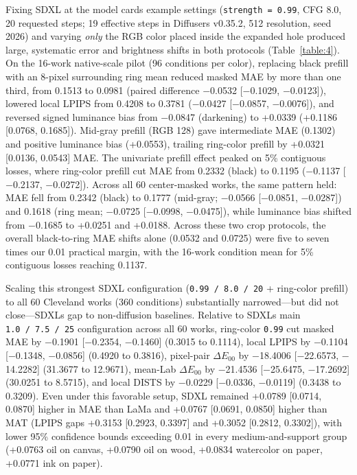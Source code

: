 \documentclass[fleqn,12pt,lineno]{wlpeerj}
\begin{document}
Fixing SDXL at the model card\textquotesingle s example settings (\texttt{strength\ =\ 0.99}, CFG 8.0, 20 requested steps; 19 effective steps in Diffusers v0.35.2, 512 resolution, seed 2026) and varying \emph{only} the RGB color placed inside the expanded hole produced large, systematic error and brightness shifts in both protocols (Table~\ref{table:4}). On the 16-work native-scale pilot (96 conditions per color), replacing black prefill with an 8-pixel surrounding ring mean reduced masked MAE by more than one third, from 0.1513 to 0.0981 (paired difference \ensuremath{-}0.0532 {[}\ensuremath{-}0.1029, \ensuremath{-}0.0123{]}), lowered local LPIPS from 0.4208 to 0.3781 (\ensuremath{-}0.0427 {[}\ensuremath{-}0.0857, \ensuremath{-}0.0076{]}), and reversed signed luminance bias from \ensuremath{-}0.0847 (darkening) to +0.0339 (+0.1186 {[}0.0768, 0.1685{]}). Mid-gray prefill (RGB 128) gave intermediate MAE (0.1302) and positive luminance bias (+0.0553), trailing ring-color prefill by +0.0321 {[}0.0136, 0.0543{]} MAE. The univariate prefill effect peaked on 5\% contiguous losses, where ring-color prefill cut MAE from 0.2332 (black) to 0.1195 (\ensuremath{-}0.1137 {[}\ensuremath{-}0.2137, \ensuremath{-}0.0272{]}). Across all 60 center-masked works, the same pattern held: MAE fell from 0.2342 (black) to 0.1777 (mid-gray; \ensuremath{-}0.0566 {[}\ensuremath{-}0.0851, \ensuremath{-}0.0287{]}) and 0.1618 (ring mean; \ensuremath{-}0.0725 {[}\ensuremath{-}0.0998, \ensuremath{-}0.0475{]}), while luminance bias shifted from \ensuremath{-}0.1685 to +0.0251 and +0.0188. Across these two crop protocols, the overall black-to-ring MAE shifts alone (0.0532 and 0.0725) were five to seven times our 0.01 practical margin, with the 16-work condition mean for 5\% contiguous losses reaching 0.1137.



Scaling this strongest SDXL configuration (\texttt{0.99\ /\ 8.0\ /\ 20} + ring-color prefill) to all 60 Cleveland works (360 conditions) substantially narrowed---but did not close---SDXL\textquotesingle s gap to non-diffusion baselines. Relative to SDXL\textquotesingle s main \texttt{1.0\ /\ 7.5\ /\ 25} configuration across all 60 works, ring-color \texttt{0.99} cut masked MAE by \ensuremath{-}0.1901 {[}\ensuremath{-}0.2354, \ensuremath{-}0.1460{]} (0.3015 to 0.1114), local LPIPS by \ensuremath{-}0.1104 {[}\ensuremath{-}0.1348, \ensuremath{-}0.0856{]} (0.4920 to 0.3816), pixel-pair \texttt{\ensuremath{\Delta E_{00}}} by \ensuremath{-}18.4006 {[}\ensuremath{-}22.6573, \ensuremath{-}14.2282{]} (31.3677 to 12.9671), mean-Lab \texttt{\ensuremath{\Delta E_{00}}} by \ensuremath{-}21.4536 {[}\ensuremath{-}25.6475, \ensuremath{-}17.2692{]} (30.0251 to 8.5715), and local DISTS by \ensuremath{-}0.0229 {[}\ensuremath{-}0.0336, \ensuremath{-}0.0119{]} (0.3438 to 0.3209). Even under this favorable setup, SDXL remained +0.0789 {[}0.0714, 0.0870{]} higher in MAE than LaMa and +0.0767 {[}0.0691, 0.0850{]} higher than MAT (LPIPS gaps +0.3153 {[}0.2923, 0.3397{]} and +0.3052 {[}0.2812, 0.3302{]}), with lower 95\% confidence bounds exceeding 0.01 in every medium-and-support group (+0.0763 oil on canvas, +0.0790 oil on wood, +0.0834 watercolor on paper, +0.0771 ink on paper).
\end{document}
